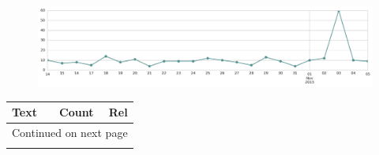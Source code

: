\begin{figure}[htbp!]
    \centering
    \includegraphics[width=\textwidth]{twitter_all/report_images/topic-22-timeseries.jpg}
\end{figure}

\begin{longtable}{p{12.5cm}rr}
\toprule
Text & Count & Rel \\
\midrule
\endhead
\midrule
\multicolumn{3}{r}{{Continued on next page}} \\
\midrule
\endfoot


\end{longtable}

